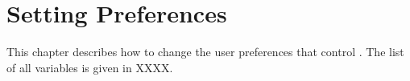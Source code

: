 
\chapter{Setting Preferences}
\label{cha:upref}

This chapter describes how to change the user preferences that control
\Pyb. The list of all variables is given in XXXX.






